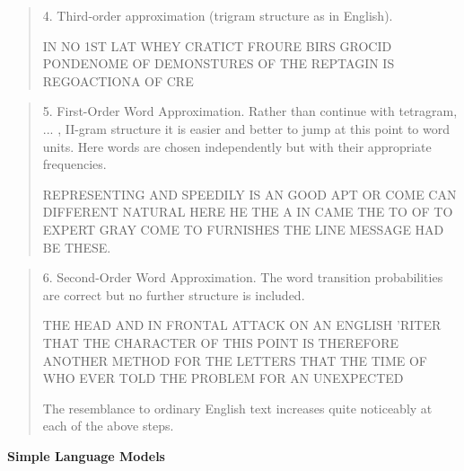 \documentclass{beamer}
\begin{document}
\begin{frame}[allowframebreaks]
  \begin{center}
  \end{center}
  \begin{quote}
   
  4. Third-order approximation (trigram structure as in English).

IN NO 1ST LAT WHEY CRATICT FROURE BIRS GROCID
PONDENOME OF DEMONSTURES OF THE REPTAGIN IS
REGOACTIONA OF CRE
  \end{quote}

  \begin{quote}
5. First-Order Word Approximation. Rather than continue with tetragram,
... , II-gram structure it is easier and better to jump at this
point to word units. Here words are chosen independently but with
their appropriate frequencies.

REPRESENTING AND SPEEDILY IS AN GOOD APT OR
COME CAN DIFFERENT NATURAL HERE HE THE A IN
CAME THE TO OF TO EXPERT GRAY COME TO FURNISHES
THE LINE MESSAGE HAD BE THESE.

  \end{quote}

  \begin{quote}
    6. Second-Order Word Approximation. The word transition probabilities
are correct but no further structure is included.

THE HEAD AND IN FRONTAL ATTACK ON AN ENGLISH
'RITER THAT THE CHARACTER OF THIS POINT IS
THEREFORE ANOTHER METHOD FOR THE LETTERS
THAT THE TIME OF WHO EVER TOLD THE PROBLEM
FOR AN UNEXPECTED

The resemblance to ordinary English text increases quite noticeably at
each of the above steps.

  \end{quote}
\end{frame}

\begin{frame}
  \begin{center}
    \textbf{Simple Language Models}
  \end{center}
\end{frame}
\end{document}
